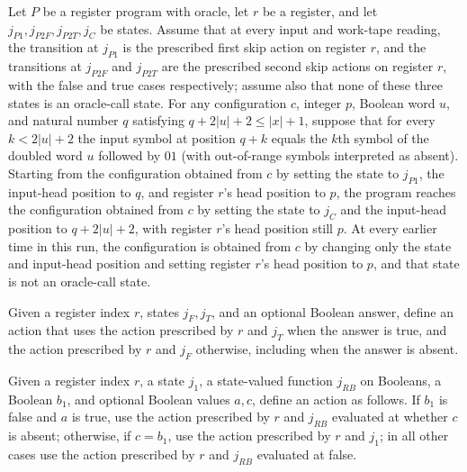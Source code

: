 \begin{lemma}
\label{Complexity.LogProg.pairSkip_run}
\leanok
{}
Let $P$ be a register program with oracle, let $r$ be a register, and let
$j_{P1},j_{P2F},j_{P2T},j_C$ be states. Assume that at every input and work-tape
reading, the transition at $j_{P1}$ is the prescribed first skip action on register $r$,
and the transitions at $j_{P2F}$ and $j_{P2T}$ are the prescribed second skip actions on
register $r$, with the false and true cases respectively; assume also that none of these
three states is an oracle-call state. For any configuration $c$, integer $p$, Boolean
word $u$, and natural number $q$ satisfying $q+2|u|+2\le |x|+1$, suppose that for every
$k<2|u|+2$ the input symbol at position $q+k$ equals the $k$th symbol of the doubled
word $u$ followed by $01$ (with out-of-range symbols interpreted as absent). Starting
from the configuration obtained from $c$ by setting the state to $j_{P1}$, the
input-head position to $q$, and register $r$'s head position to $p$, the program reaches
the configuration obtained from $c$ by setting the state to $j_C$ and the input-head
position to $q+2|u|+2$, with register $r$'s head position still $p$. At every earlier
time in this run, the configuration is obtained from $c$ by changing only the state and
input-head position and setting register $r$'s head position to $p$, and that state is
not an oracle-call state.
\end{lemma}

\begin{definition}
\label{Complexity.LogProg.dcmp1Act}
\leanok
{}
Given a register index $r$, states $j_F,j_T$, and an optional Boolean answer, define an
action that uses the action prescribed by $r$ and $j_T$ when the answer is true, and the
action prescribed by $r$ and $j_F$ otherwise, including when the answer is absent.
\end{definition}

\begin{definition}
\label{Complexity.LogProg.dcmp2Act}
\leanok
{}
Given a register index $r$, a state $j_1$, a state-valued function $j_{RB}$ on Booleans,
a Boolean $b_1$, and optional Boolean values $a,c$, define an action as follows. If
$b_1$ is false and $a$ is true, use the action prescribed by $r$ and $j_{RB}$ evaluated
at whether $c$ is absent; otherwise, if $c=b_1$, use the action prescribed by $r$ and
$j_1$; in all other cases use the action prescribed by $r$ and $j_{RB}$ evaluated at
false.
\end{definition}

